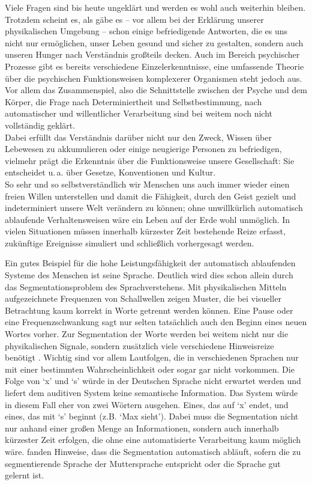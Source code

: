 \documentclass[doc,a4paper,12pt]{apa6}
\begin{document}
Viele Fragen sind bis heute ungeklärt und werden es wohl auch weiterhin bleiben. Trotzdem scheint es, als gäbe es – vor allem bei der Erklärung unserer physikalischen Umgebung – schon einige befriedigende Antworten, die es uns nicht nur ermöglichen, unser Leben gesund und sicher zu gestalten, sondern auch unseren Hunger nach Verständnis großteils decken. Auch im Bereich psychischer Prozesse gibt es bereits verschiedene Einzelerkenntnisse, eine umfassende Theorie über die psychischen Funktionsweisen komplexerer Organismen steht jedoch aus. Vor allem das Zusammenspiel, also die Schnittstelle zwischen der Psyche und dem Körper, die Frage nach Determiniertheit und Selbstbestimmung, nach automatischer und willentlicher Verarbeitung sind bei weitem noch nicht vollständig geklärt.\\
Dabei erfüllt das Verständnis darüber nicht nur den Zweck, Wissen über Lebewesen zu akkumulieren oder einige neugierige Personen zu befriedigen, vielmehr prägt die Erkenntnis über die Funktionsweise unsere Gesellschaft: Sie entscheidet u.\,a. über Gesetze, Konventionen und Kultur.\\
So sehr und so selbstverständlich wir Menschen uns auch immer wieder einen freien Willen unterstellen und damit die Fähigkeit, durch den Geist gezielt und indeterminiert unsere Welt verändern zu können; ohne unwillkürlich automatisch ablaufende Verhaltensweisen wäre ein Leben auf der Erde wohl unmöglich. In vielen Situationen müssen innerhalb kürzester Zeit bestehende Reize erfasst, zukünftige Ereignisse simuliert und schließlich vorhergesagt werden.

Ein gutes Beispiel für die hohe Leistungsfähigkeit der automatisch ablaufenden Systeme des Menschen ist seine Sprache. Deutlich wird dies schon allein durch das Segmentationsproblem des Sprachverstehens. Mit physikalischen Mitteln aufgezeichnete Frequenzen von Schallwellen zeigen Muster, die bei visueller Betrachtung kaum korrekt in Worte getrennt werden können. Eine Pause oder eine Frequenzschwankung sagt nur selten tatsächlich auch den Beginn eines neuen Wortes vorher. Zur Segmentation der Worte werden bei weitem nicht nur die physikalischen Signale, sondern zusätzlich viele verschiedene Hinweisreize benötigt \parencites[u.\,a.][]{brent1996distributional}{saffran1996word}. Wichtig sind vor allem Lautfolgen, die in verschiedenen Sprachen nur mit einer bestimmten Wahrscheinlichkeit oder sogar gar nicht vorkommen. Die Folge von `x' und `s' würde in der Deutschen Sprache nicht erwartet werden und liefert dem auditiven System keine semantische Information. Das System würde in diesem Fall eher von zwei Wörtern ausgehen. Eines, das auf `x' endet, und eines, das mit `s' beginnt (z.B. `Max sieht'). Dabei muss die Segmentation nicht nur anhand einer großen Menge an Informationen, sondern auch innerhalb kürzester Zeit erfolgen, die ohne eine automatisierte Verarbeitung kaum möglich wäre. \textcite{sanders2002segmenting} fanden Hinweise, dass die Segmentation automatisch abläuft, sofern die zu segmentierende Sprache der Muttersprache entspricht oder die Sprache gut gelernt ist.
\end{document}
